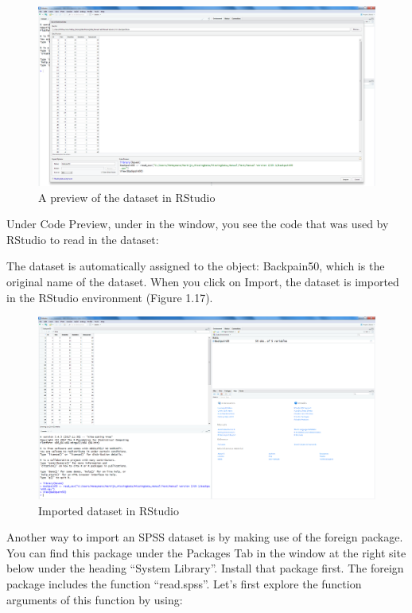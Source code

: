 \documentclass[]{book}
\begin{document}
\begin{figure}

{\centering \includegraphics[width=0.9\linewidth]{images/fig1.16} 

}

\caption{A preview of the dataset in RStudio}\label{fig:fig16}
\end{figure}

Under Code Preview, under in the window, you see the code that was used
by RStudio to read in the dataset:

The dataset is automatically assigned to the object: Backpain50, which
is the original name of the dataset. When you click on Import, the
dataset is imported in the RStudio environment (Figure 1.17).

\begin{figure}

{\centering \includegraphics[width=0.9\linewidth]{images/fig1.17} 

}

\caption{Imported dataset in RStudio}\label{fig:fig17}
\end{figure}

Another way to import an SPSS dataset is by making use of the foreign
package. You can find this package under the Packages Tab in the window
at the right site below under the heading ``System Library''. Install
that package first. The foreign package includes the function
``read.spss''. Let's first explore the function arguments of this
function by using:
\end{document}
